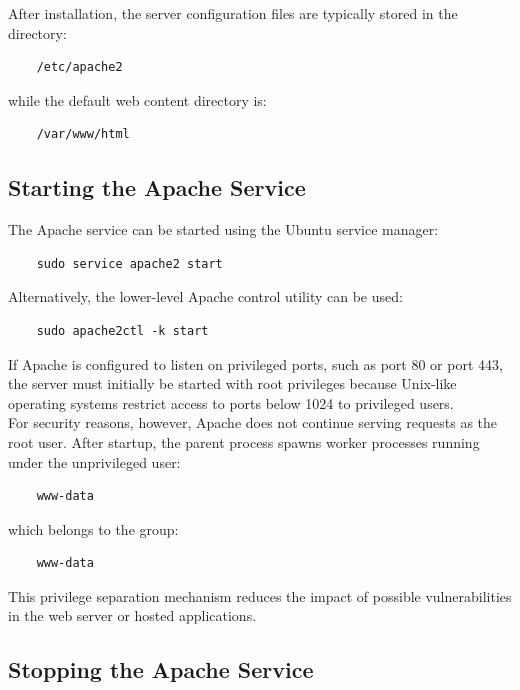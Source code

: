 \documentclass{scrbook}
\begin{document}
	After installation, the server configuration files are typically stored in the directory:
	
	\begin{lstlisting}
	/etc/apache2
	\end{lstlisting}
	
	while the default web content directory is:
	
	\begin{lstlisting}
	/var/www/html
	\end{lstlisting}
	
	\subsection{Starting the Apache Service}
	
	The Apache service can be started using the Ubuntu service manager:
	
	\begin{lstlisting}
	sudo service apache2 start
	\end{lstlisting}
	
	Alternatively, the lower-level Apache control utility can be used:
	
	\begin{lstlisting}
	sudo apache2ctl -k start
	\end{lstlisting}
	
	If Apache is configured to listen on privileged ports, such as port 80 or port 443, the server must initially be started with root privileges because Unix-like operating systems restrict access to ports below 1024 to privileged users.\\
	
	For security reasons, however, Apache does not continue serving requests as the root user. After startup, the parent process spawns worker processes running under the unprivileged user:
	
	\begin{lstlisting}
	www-data
	\end{lstlisting}
	
	which belongs to the group:
	
	\begin{lstlisting}
	www-data
	\end{lstlisting}
	
	This privilege separation mechanism reduces the impact of possible vulnerabilities in the web server or hosted applications.
	
	\subsection{Stopping the Apache Service}
	
\end{document}
